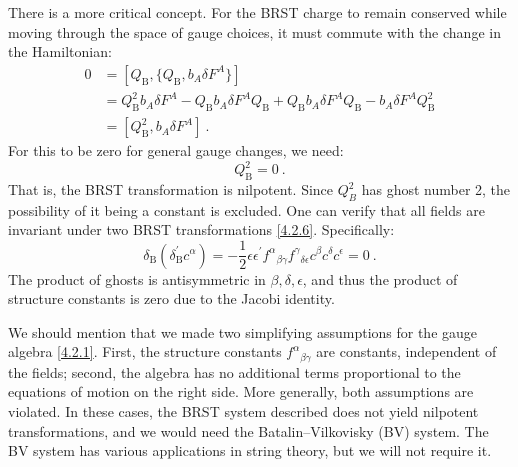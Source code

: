 There is a more critical concept. For the BRST charge to remain conserved while moving through the space of gauge choices, it must commute with the change in the Hamiltonian:
\begin{align}
	0 &=[Q_{\mathrm{B}},\{Q_{\mathrm{B}}, b_{A} \delta F^{A}\}]  	\nonumber\\
	&=Q_{\mathrm{B}}^{2} b_{A} \delta F^{A}-Q_{\mathrm{B}} b_{A} \delta F^{A} Q_{\mathrm{B}}+Q_{\mathrm{B}} b_{A} \delta F^{A} Q_{\mathrm{B}}-b_{A} \delta F^{A} Q_{\mathrm{B}}^{2}  \nonumber \\
	&=[Q_{\mathrm{B}}^{2}, b_{A} \delta F^{A}] \:.
	\label{4.2.12}
\end{align}
For this to be zero for general gauge changes, we need:
\begin{equation}
	Q_{\mathrm{B}}^{2}=0 \:. \label{4.2.13}
\end{equation}
That is, the BRST transformation is nilpotent. Since $Q_B^2$ has ghost number 2, the possibility of it being a constant is excluded. One can verify that all fields are invariant under two BRST transformations \eqref{4.2.6}. Specifically:
\begin{equation}
	\delta_{\mathrm{B}}(\delta_{\mathrm{B}}^{\prime} c^{\alpha})=-\frac{1}{2} \epsilon \epsilon^{\prime} f^{\alpha}{}_{\beta \gamma} f^{\gamma}{}_{\delta \epsilon} c^{\beta} c^{\delta} c^{\epsilon}=0 \:. \label{4.2.14}
\end{equation}
The product of ghosts is antisymmetric in $\beta, \delta, \epsilon$, and thus the product of structure constants is zero due to the Jacobi identity.

We should mention that we made two simplifying assumptions for the gauge algebra \eqref{4.2.1}. First, the structure constants $f^{\alpha}{ }_{\beta \gamma}$ are constants, independent of the fields; second, the algebra has no additional terms proportional to the equations of motion on the right side. More generally, both assumptions are violated. In these cases, the BRST system described does not yield nilpotent transformations, and we would need the Batalin–Vilkovisky (BV) system. The BV system has various applications in string theory, but we will not require it.


